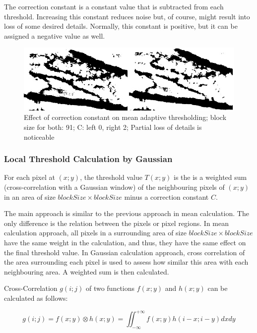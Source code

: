 The correction constant is a constant value that is subtracted from each threshold. Increasing this constant reduces noise but, of course, might result into loss of some desired details. Normally, this constant is positive, but it can be assigned a negative value as well.

\begin{figure}[H]
\centering
\includegraphics[scale=0.8]{figures/compare2.JPG}


\caption[Effect of correction constant on mean adaptive thresholding]{Effect of correction constant on mean adaptive thresholding; block size for both: 91; C: left 0, right 2; Partial loss of details is noticeable}\label{fig:compare2}
\end{figure}

\subsubsection{Local Threshold Calculation by Gaussian}
For each pixel at $(x; y)$, the threshold value $T(x; y)$ is the is a weighted sum (cross-correlation with a Gaussian window) of the neighbouring pixels of $(x; y)$ in an area of size $blockSize \times blockSize$ minus a correction constant $C$. 

The main approach is similar to the previous approach in mean calculation. The only difference is the relation between the pixels or pixel regions. In mean calculation approach, all pixels in a surrounding area of size $blockSize \times blockSize$ have the same weight in the calculation, and thus, they have the same effect on the final threshold value. In Gaussian calculation approach, cross correlation of the area surrounding each pixel is used to assess how similar this area with each neighbouring area. A weighted sum is then calculated.

Cross-Correlation $g(i ;j)$ of two functions $f(x ;y)$ and $ h(x; y)$ can be calculated as follows:

\begin{equation}
g(i;j) = f(x; y) \otimes h(x; y) = \iint_{-\infty}^{+\infty} f(x; y) h(i - x; i - y) dx dy
\end{equation}
 
